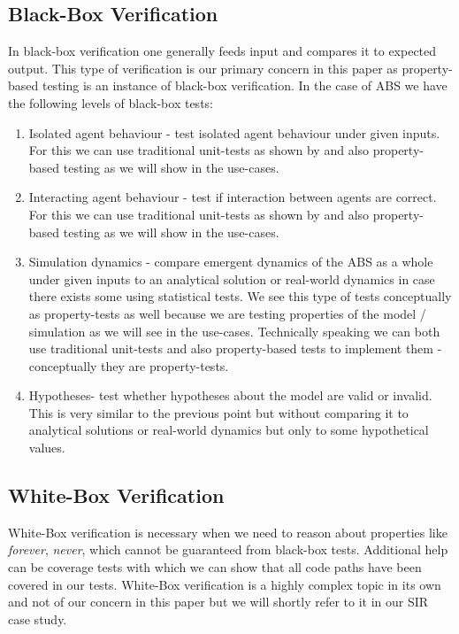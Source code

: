 \subsection{Black-Box Verification}
In black-box verification one generally feeds input and compares it to expected output. This type of verification is our primary concern in this paper as property-based testing is an instance of black-box verification. In the case of ABS we have the following levels of black-box tests:
\begin{enumerate}
	\item Isolated agent behaviour - test isolated agent behaviour under given inputs. For this we can use traditional unit-tests as shown by \cite{collier_test-driven_2013} and also property-based testing as we will show in the use-cases.
	\item Interacting agent behaviour - test if interaction between agents are correct. For this we can use traditional unit-tests as shown by \cite{collier_test-driven_2013} and also property-based testing as we will show in the use-cases.
	\item Simulation dynamics - compare emergent dynamics of the ABS as a whole under given inputs to an analytical solution or real-world dynamics in case there exists some using statistical tests. We see this type of tests conceptually as property-tests as well because we are testing properties of the model / simulation as we will see in the use-cases. Technically speaking we can both use traditional unit-tests and also property-based tests to implement them - conceptually they are property-tests.
	\item Hypotheses- test whether hypotheses about the model are valid or invalid. This is very similar to the previous point but without comparing it to analytical solutions or real-world dynamics but only to some hypothetical values.
\end{enumerate}

\subsection{White-Box Verification}
White-Box verification is necessary when we need to reason about properties like \textit{forever}, \textit{never}, which cannot be guaranteed from black-box tests. Additional help can be coverage tests with which we can show that all code paths have been covered in our tests. White-Box verification is a highly complex topic in its own and not of our concern in this paper but we will shortly refer to it in our SIR case study.


